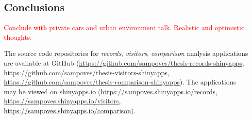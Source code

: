 \newpage
\subsection{Conclusions}
\justify

\textcolor{red}{Conclude with private cars and urban environment talk. Realistic and optimistic thoughts.}

The source code repositories for \textit{records}, \textit{visitors}, \textit{comparison} analysis applications are available at GitHub (\textcolor{blue}{\url{https://github.com/sampoves/thesis-records-shinyapps}}, \textcolor{blue}{\url{https://github.com/sampoves/thesis-visitors-shinyapps}}, \textcolor{blue}{\url{https://github.com/sampoves/thesis-comparison-shinyapps}}). The applications may be viewed on shinyapps.io (\textcolor{blue}{\url{https://sampoves.shinyapps.io/records}}, \textcolor{blue}{\url{https://sampoves.shinyapps.io/visitors}}, \textcolor{blue}{\url{https://sampoves.shinyapps.io/comparison}}).